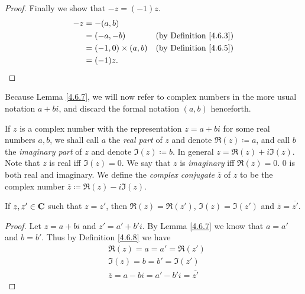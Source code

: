 \begin{proof}
    Finally we show that \(-z = (-1) z\).
    \begin{align*}
        -z & = -(a, b)                                                    \\
           & = (-a, -b)              & \text{(by Definition \ref{4.6.3})} \\
           & = (-1, 0) \times (a, b) & \text{(by Definition \ref{4.6.5})} \\
           & = (-1) z.
    \end{align*}
\end{proof}

\begin{note}
    Because Lemma \ref{4.6.7}, we will now refer to complex numbers in the more usual notation \(a + bi\), and discard the formal notation \((a, b)\) henceforth.
\end{note}

\begin{definition}\label{4.6.8}
    If \(z\) is a complex number with the representation \(z = a + bi\) for some real numbers \(a, b\), we shall call \(a\) the \emph{real part} of \(z\) and denote \(\Re(z) \coloneqq a\), and call \(b\) the \emph{imaginary part} of \(z\) and denote \(\Im(z) \coloneqq b\).
    In general \(z = \Re(z) + i \Im(z)\).
    Note that \(z\) is real iff \(\Im(z) = 0\).
    We say that \(z\) is \emph{imaginary} iff \(\Re(z) = 0\).
    \(0\) is both real and imaginary.
    We define the \emph{complex conjugate} \(\overline{z}\) of \(z\) to be the complex number \(\overline{z} \coloneqq \Re(z) - i \Im(z)\).
\end{definition}

\begin{additional corollary}\label{ac 4.6.4}
If \(z, z' \in \mathbf{C}\) such that \(z = z'\), then \(\Re(z) = \Re(z')\), \(\Im(z) = \Im(z')\) and \(\overline{z} = \overline{z'}\).
\end{additional corollary}

\begin{proof}
    Let \(z = a + bi\) and \(z' = a' + b' i\).
    By Lemma \ref{4.6.7} we know that \(a = a'\) and \(b = b'\).
    Thus by Definition \ref{4.6.8} we have
    \begin{align*}
         & \Re(z) = a = a' = \Re(z')                         \\
         & \Im(z) = b = b' = \Im(z')                         \\
         & \overline{z} = a - bi = a' - b' i = \overline{z'}
    \end{align*}
\end{proof}

